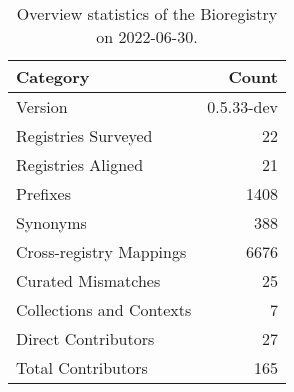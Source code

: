\begin{table}
\centering
\caption{Overview statistics of the Bioregistry on 2022-06-30.}
\label{tab:bioregistry-summary}
\begin{tabular}{lr}
\toprule
                Category &      Count \\
\midrule
                 Version & 0.5.33-dev \\
     Registries Surveyed &         22 \\
      Registries Aligned &         21 \\
                Prefixes &       1408 \\
                Synonyms &        388 \\
 Cross-registry Mappings &       6676 \\
      Curated Mismatches &         25 \\
Collections and Contexts &          7 \\
     Direct Contributors &         27 \\
      Total Contributors &        165 \\
\bottomrule
\end{tabular}
\end{table}
